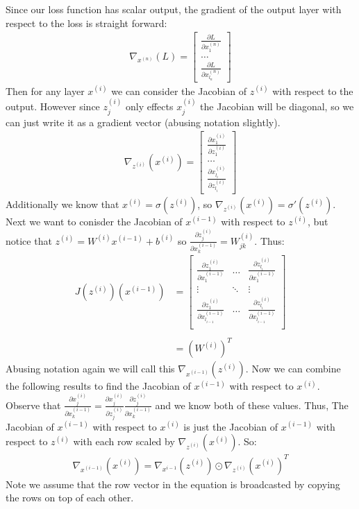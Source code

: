 \documentclass[12pt]{article}
\begin{document}
Since our loss function has scalar output, the gradient of the output layer
with respect to the loss is straight forward:
\begin{align*}
    \nabla_{x^{(n)}}(L) = \begin{bmatrix}
        \frac{\partial L}{\partial x^{(n)}_1} \\ \ldots \\ \frac{\partial L}{\partial x^{(n)}_{l_n}}
    \end{bmatrix}
\end{align*}
Then for any layer $x^{(i)}$ we can consider the Jacobian of $z^{(i)}$ with
respect to the output. However since $z^{(i)}_j$ only effects $x^{(i)}_j$ the
Jacobian will be diagonal, so we can just write it as a gradient vector (abusing notation
slightly).
\begin{align*}
        \nabla_{z^{(i)}}(x^{(i)}) = \begin{bmatrix}
        \frac{\partial x^{(i)}_1}{\partial z^{(i)}_1} \\ \ldots \\ \frac{\partial x^{(i)}_{l_i}}{\partial z^{(i)}_{l_i}}
    \end{bmatrix}
\end{align*}
Additionally we know that $x^{(i)} = \sigma(z^{(i)})$, so $\nabla_{z^{(i)}}(x^{(i)}) = \sigma'(z^{(i)})$. 
Next we want to conisder the Jacobian of $x^{(i-1)}$ with respect to $z^{(i)}$, but notice that
$z^{(i)} = W^{(i)}x^{(i-1)} + b^{(i)}$ so $\frac{\partial z^{(i)}_j}{\partial x^{(i-1)}_k} = W^{(i)}_{jk}$. Thus:
\begin{align*}
    J(z^{(i)})(x^{(i-1)}) &= \begin{bmatrix}
        \frac{\partial z^{(i)}_1}{\partial x^{(i-1)}_1} & \ldots  & \frac{\partial z^{(i)}_{l_i}}{\partial x^{(i-1)}_1} \\
        \vdots & \ddots & \vdots \\
        \frac{\partial z^{(i)}_1}{\partial x^{(i-1)}_{l_{i-1}}} & \ldots  & \frac{\partial z^{(i)}_{l_i}}{\partial x^{(i-1)}_{l_{i-1}}} \\
    \end{bmatrix}
    \\ \\
    &= (W^{(i)})^T
\end{align*}
Abusing notation again we will call this $\nabla_{x^{(i-1)}}(z^{(i)})$. Now we can combine the following results to find
the Jacobian of $x^{(i-1)}$ with respect to $x^{(i)}$. Observe that $\frac{\partial x^{(i)}_j}{\partial x^{(i-1)}_k} = 
\frac{\partial x^{(i)}_j}{\partial z^{(i)}_j}\frac{\partial z^{(i)}_j}{\partial x^{(i-1)}_k}$ and we know both of these values.
Thus, The Jacobian of $x^{(i-1)}$ with respect to $x^{(i)}$ is just the  Jacobian of $x^{(i-1)}$ with respect to $z^{(i)}$ with each row
scaled by $\nabla_{z^{(i)}}(x^{(i)})$. So:
\begin{align*}
    \nabla_{x^{(i-1)}}(x^{(i)}) = \nabla_{x^{i-1}}(z^{(i)}) \odot \nabla_{z^{(i)}}(x^{(i)})^T
\end{align*}
Note we assume that the row vector in the equation is broadcasted by copying the rows on top of each other.
\end{document}
